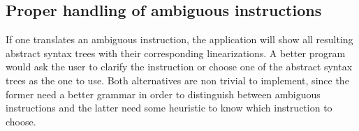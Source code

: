 \subsection*{Proper handling of ambiguous instructions}
If one translates an ambiguous instruction, the application will show all resulting abstract syntax trees with their corresponding linearizations. A better program would ask the user to clarify the instruction or choose one of the abstract syntax trees as the one to use. Both alternatives are non trivial to implement, since the former need a better grammar in order to distinguish between ambiguous instructions and the latter need some heuristic to know which instruction to choose.